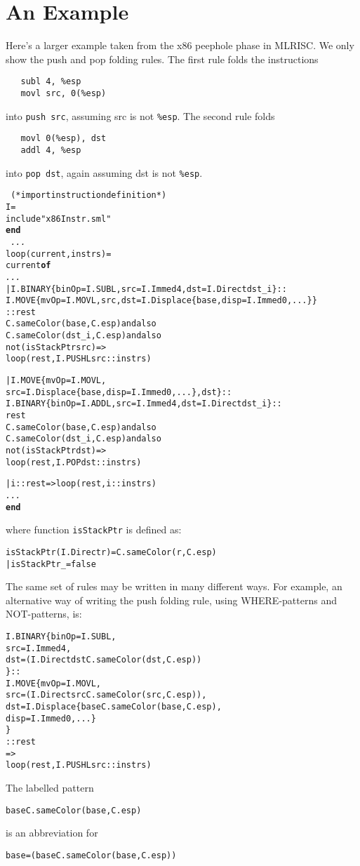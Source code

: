 \documentclass{article}
\newcommand{\END}{{\bf end}}
\newcommand{\OF}{{\bf of}}
\begin{document}
\section{An Example}
Here's a larger example taken from the x86 peephole phase in MLRISC.
We only show the push and pop folding rules.  The first rule
folds the instructions 
\begin{verbatim}
   subl 4, %esp
   movl src, 0(%esp)
\end{verbatim}
into \verb|push src|, assuming src is not \verb|%esp|. 
The second rule folds
\begin{verbatim}
   movl 0(%esp), dst
   addl 4, %esp
\end{verbatim}
into \verb|pop dst|, again assuming dst is not \verb|%esp|.

\begin{alltt}
\LOCAL\ 
   (* import instruction definition *)
   \STRUCTURE I = 
   \STRUCT
      include "x86Instr.sml" 
   \END
\IN\ 
   {\sl ...}
   \FUN loop(current, instrs) =
       \CASE current \OF
         {\sl ...}
      | I.BINARY\{binOp=I.SUBL, src=I.Immed 4, dst=I.Direct dst_i\}:: 
        I.MOVE\{mvOp=I.MOVL,src,dst=I.Displace\{base,disp=I.Immed 0,...\}\}
        ::rest 
           \WHERE C.sameColor(base, C.esp) andalso
                  C.sameColor(dst_i, C.esp) andalso
                  not(isStackPtr src) =>
           loop(rest, I.PUSHL src::instrs)
               
      | I.MOVE\{mvOp=I.MOVL, 
              src=I.Displace\{base, disp=I.Immed 0, ...\}, dst\}::
        I.BINARY\{binOp=I.ADDL, src=I.Immed 4, dst=I.Direct dst_i\}:: 
        rest 
           \WHERE C.sameColor(base, C.esp) andalso
                 C.sameColor(dst_i,C.esp) andalso
                 not(isStackPtr dst) =>
           loop(rest, I.POP dst::instrs)

     | i::rest => loop(rest, i::instrs)
     {\sl ...}
\END
\end{alltt}
where function \verb|isStackPtr| is defined as:
\begin{alltt}
  \FUN isStackPtr(I.Direct r) = C.sameColor(r,C.esp)
     | isStackPtr _ = false
\end{alltt}

The same set of rules may be written in many different ways.
For example, an alternative way of writing the push folding rule, using
WHERE-patterns and NOT-patterns, is:
\begin{alltt}
     I.BINARY\{binOp=I.SUBL, 
               src=I.Immed 4, 
               dst=(I.Direct dst \WHERE C.sameColor(dst,C.esp))
             \}:: 
     I.MOVE\{mvOp=I.MOVL,
             src=\NOT (I.Direct src \WHERE C.sameColor(src,C.esp)),
             dst=I.Displace\{base \WHERE C.sameColor(base,C.esp),
                             disp=I.Immed 0,...\}
           \}
     ::rest 
        =>
         loop(rest, I.PUSHL src::instrs)
\end{alltt}
The labelled pattern 
\begin{alltt}
   base \WHERE C.sameColor(base,C.esp)
\end{alltt}
is an abbreviation for 
\begin{alltt}
   base=(base \WHERE C.sameColor(base,C.esp))
\end{alltt}
\end{document}
